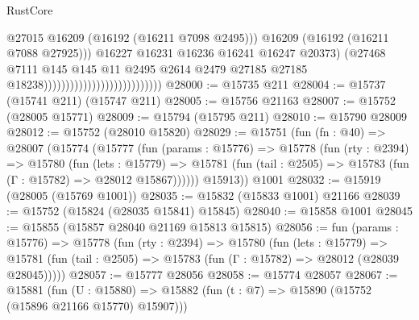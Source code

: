 \begin{lexlean}{RustCore}
\begin{coremodule}
                                                              @27015
                                                              @16209
                                                              (@16192 (@16211 @7098 @2495)))
                                                            @16209
                                                            (@16192 (@16211 @7088 @27925)))
                                                          @16227
                                                          @16231
                                                          @16236
                                                          @16241
                                                          @16247
                                                          @20373)
                                                        (@27468
                                                          @7111
                                                          @145
                                                          @145
                                                          @11
                                                          @2495
                                                          @2614
                                                          @2479
                                                          @27185
                                                          @27185
                                                          @18238)))))))))))))))))))))))))))
@28000 := @15735 @211
@28004 := @15737 (@15741 @211) (@15747 @211)
@28005 := @15756 @21163
@28007 := @15752 (@28005 @15771)
@28009 := @15794 (@15795 @211)
@28010 := @15790 @28009
@28012 := @15752 (@28010 @15820)
@28029 := @15751
    (fun (fn : @40) =>
    @28007
      (@15774
        (@15777
          (fun (params : @15776) =>
          @15778
            (fun (rty : @2394) =>
            @15780
              (fun (lets : @15779) =>
              @15781 (fun (tail : @2505) => @15783 (fun (Γ : @15782) => @28012 @15867))))))
        @15913))
    @1001
@28032 := @15919 (@28005 (@15769 @1001))
@28035 := @15832 (@15833 @1001) @21166
@28039 := @15752 (@15824 (@28035 @15841) @15845)
@28040 := @15858 @1001
@28045 := @15855 (@15857 @28040 @21169 @15813 @15815)
@28056 := fun (params : @15776) =>
  @15778
    (fun (rty : @2394) =>
    @15780
      (fun (lets : @15779) =>
      @15781 (fun (tail : @2505) => @15783 (fun (Γ : @15782) => @28012 (@28039 @28045)))))
@28057 := @15777 @28056
@28058 := @15774 @28057
@28067 := @15881
    (fun (U : @15880) => @15882 (fun (t : @7) => @15890 (@15752 (@15896 @21166 @15770) @15907)))

\end{coremodule}
\end{lexlean}

